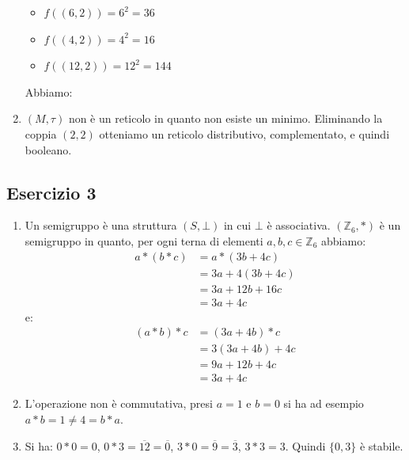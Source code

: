 \begin{enumerate}[label=(\textit{\roman*})]
\begin{itemize}
	\item $f((6,2))=6^{2}=36$
	\item $f((4,2))=4^{2}=16$
	\item $f((12,2))=12^{2}=144$
\end{itemize} 
Abbiamo:
\begin{center}
\end{center}
\item $(M,\tau)$ non è un reticolo in quanto non esiste un minimo. Eliminando la coppia $(2,2)$ otteniamo un reticolo distributivo, complementato, e quindi booleano.
\end{enumerate}

\subsection*{Esercizio 3}
\begin{enumerate}[label=(\textit{\roman*})]
	\item Un semigruppo è una struttura $(S,\bot)$ in cui $\bot$ è associativa. $(\mathbb{Z}_{6},\ast)$ è un semigruppo in quanto, per ogni terna di elementi $a,b,c \in \mathbb{Z}_{6}$ abbiamo:
	\begin{align*}
		a \ast (b \ast c) &= a \ast (3b + 4c ) \\
		&= 3a + 4(3b+4c) \\
		&= 3a + 12b + 16c \\
		&= 3a + 4c
	\end{align*}
e:
\begin{align*}
	(a \ast b) \ast c &= (3a+4b) \ast c \\
	&= 3(3a+4b)+4c \\
	&= 9a + 12b + 4c \\
	&= 3a + 4c
\end{align*}
\item L'operazione non è commutativa, presi $a=1$ e $b=0$ si ha ad esempio $a \ast b = 1 \neq 4 = b \ast a$.
\item Si ha: $0 \ast 0 = 0$, $0 \ast 3 = \overline{12}=\overline{0}$, $3 \ast 0 = \overline{9}=\overline{3}$, $3 \ast 3 = 3$. Quindi $\{0,3\}$ è stabile.
\end{enumerate}
